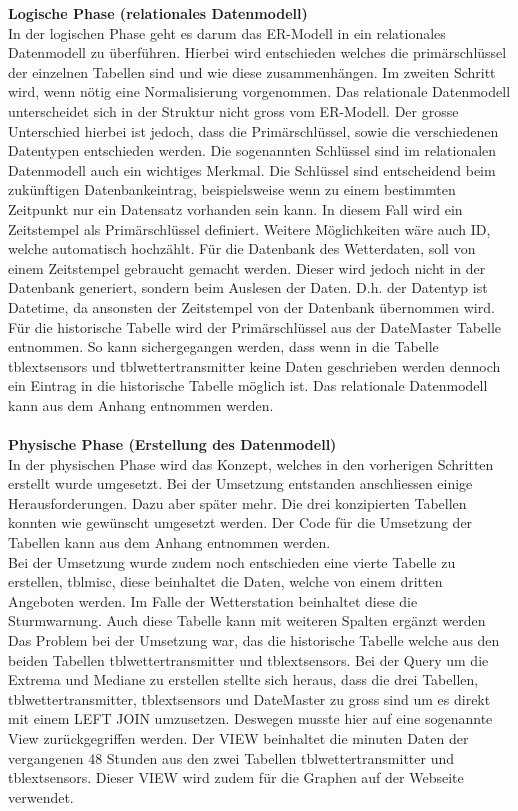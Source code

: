 \textbf{Logische Phase (relationales Datenmodell)}\\

In der logischen Phase geht es darum das ER-Modell in ein relationales Datenmodell zu überführen. Hierbei wird entschieden welches die primärschlüssel der einzelnen Tabellen sind und wie diese zusammenhängen. Im zweiten Schritt wird, wenn nötig eine Normalisierung vorgenommen. Das relationale Datenmodell unterscheidet sich in der Struktur nicht gross vom ER-Modell. Der grosse Unterschied hierbei ist jedoch, dass die Primärschlüssel, sowie die verschiedenen Datentypen entschieden werden. Die sogenannten Schlüssel sind im relationalen Datenmodell auch ein wichtiges Merkmal. Die Schlüssel sind entscheidend beim zukünftigen Datenbankeintrag, beispielsweise wenn zu einem bestimmten Zeitpunkt nur ein Datensatz vorhanden sein kann. In diesem Fall wird ein Zeitstempel als Primärschlüssel definiert. Weitere Möglichkeiten wäre auch ID, welche automatisch hochzählt. Für die Datenbank des Wetterdaten, soll von einem Zeitstempel gebraucht gemacht werden. Dieser wird jedoch nicht in der Datenbank generiert, sondern beim Auslesen der Daten. D.h. der Datentyp ist Datetime, da ansonsten der Zeitstempel von der Datenbank übernommen wird. Für die historische Tabelle wird der Primärschlüssel aus der DateMaster Tabelle entnommen. So kann sichergegangen werden, dass wenn in die Tabelle tblextsensors und tblwettertransmitter keine Daten geschrieben werden dennoch ein Eintrag in die historische Tabelle möglich ist. Das relationale Datenmodell kann aus dem Anhang  entnommen werden.\\ \\


\textbf{Physische Phase (Erstellung des Datenmodell)}\\

In der physischen Phase wird das Konzept, welches in den vorherigen Schritten erstellt wurde umgesetzt. Bei der Umsetzung entstanden anschliessen einige Herausforderungen. Dazu aber später mehr. Die drei konzipierten Tabellen konnten wie gewünscht umgesetzt werden. Der Code für die Umsetzung der Tabellen kann aus dem Anhang entnommen werden.\\
Bei der Umsetzung wurde zudem noch entschieden eine vierte Tabelle zu erstellen, tblmisc, diese beinhaltet die Daten, welche von einem dritten Angeboten werden. Im Falle der Wetterstation beinhaltet diese die Sturmwarnung. Auch diese Tabelle kann mit weiteren Spalten ergänzt werden
Das Problem bei der Umsetzung war, das die historische Tabelle welche aus den beiden Tabellen tblwettertransmitter und tblextsensors. Bei der Query um die Extrema und Mediane zu erstellen stellte sich heraus, dass die drei Tabellen, tblwettertransmitter, tblextsensors und DateMaster zu gross sind um es direkt mit einem LEFT JOIN umzusetzen. Deswegen musste hier auf eine sogenannte View zurückgegriffen werden. Der VIEW beinhaltet die minuten Daten der vergangenen 48 Stunden aus den zwei Tabellen tblwettertransmitter und tblextsensors. Dieser VIEW wird zudem für die Graphen auf der Webseite verwendet.

